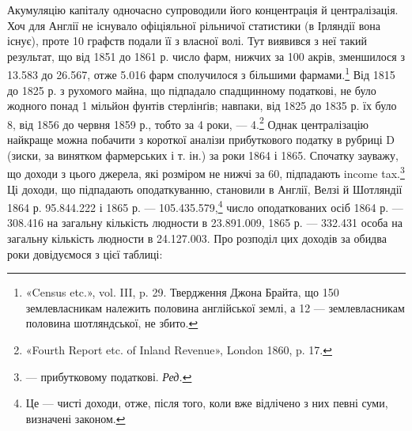 Акумуляцію капіталу одночасно супроводили його концентрація
й централізація. Хоч для Англії не існувало офіціяльної
рільничої статистики (в Ірляндії вона існує), проте 10 графств подали
її з власної волі. Тут виявився з неї такий результат, що від
1851 до 1861 р. число фарм, нижчих за 100 акрів, зменшилося з
13.583 до 26.567, отже 5.016 фарм сполучилося з більшими фармами.\footnote{
«Census etc.», vol. III, p. 29. Твердження Джона Брайта, що 150
землевласникам належить половина англійської землі, а 12 — землевласникам
половина шотляндської, не збито.
}  Від 1815 до 1825 р. з рухомого майна, що підпадало спадщинному
податкові, не було жодного понад 1 мільйон фунтів стерлінґів;
навпаки, від 1825 до 1835 р. їх було 8, від 1856 до червня
1859 р., тобто за 4 роки, — 4.\footnote{
«Fourth Report etc. of Inland Revenue», London 1860, p. 17.
} Однак централізацію найкраще
можна побачити з короткої аналізи прибуткового податку
в рубриці D (зиски, за винятком фармерських і т. ін.) за роки
1864 і 1865. Спочатку зауважу, що доходи з цього джерела,
які розміром не нижчі за 60, підпадають
income tax.\footnote*{
— прибутковому податкові. \emph{Ред.}
} Ці доходи, що підпадають оподаткуванню, становили
в Англії, Велзі й Шотляндії 1864 р. 95.844.222
і 1865 р. — 105.435.579,\footnote{
Це — чисті доходи, отже, після того, коли вже відлічено з них
певні суми, визначені законом.
} число оподаткованих
осіб 1864 р. — 308.416 на загальну кількість людности в
23.891.009, 1865 р. — 332.431 особа на загальну кількість людности
в 24.127.003. Про розподіл цих доходів за обидва роки
довідуємося з цієї таблиці:
